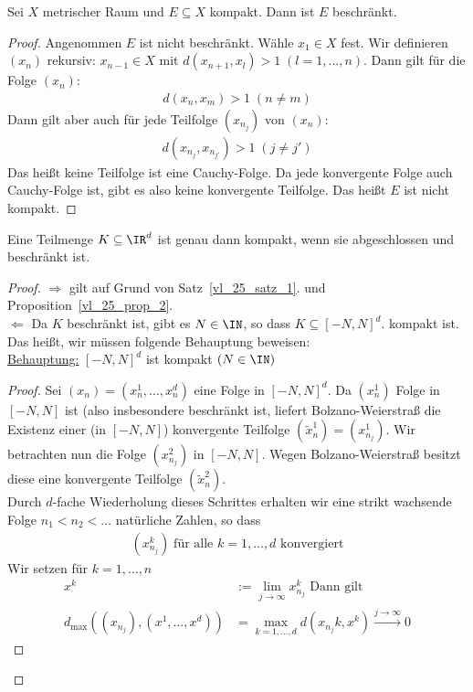 \begin{Proposition}\label{vl_25_prop_2}%
	Sei $X$ metrischer Raum und $E \subseteq X$ kompakt. Dann ist $E$ beschränkt.
\end{Proposition}

\begin{proof}
	Angenommen $E$ ist nicht beschränkt. Wähle $x_1 \in X$ fest. Wir definieren 
	$(x_n)$ rekursiv: $x_{n-1} \in X$ mit $d(x_{n+1},x_l) > 1 \; (l = 1, \hdots, 
	n)$. Dann gilt für die Folge $(x_n)$:
	\begin{align*}
		d(x_n,x_m) > 1 \;(n\neq m)
	\end{align*}
	Dann gilt aber auch für jede Teilfolge $(x_{n_j})$ von $(x_n)$:
	\begin{align*}
		d(x_{n_j},x_{n_{j\prime}}) > 1 \; (j \neq j\prime)
	\end{align*}
	Das heißt keine Teilfolge ist eine Cauchy-Folge.
	Da jede konvergente Folge auch Cauchy-Folge ist, gibt es also keine konvergente 
	Teilfolge. Das heißt $E$ ist nicht kompakt.
\end{proof}

\begin{theorem}\label{satz_v_heine_borel}
	Eine Teilmenge $K \subseteq \IR^d$ ist genau dann kompakt, wenn sie 
	abgeschlossen und beschränkt ist.
\end{theorem}

\begin{proof}
$\Rightarrow$ gilt auf Grund von Satz~\ref{vl_25_satz_1}. und 
Proposition~\ref{vl_25_prop_2}.\\
$\Leftarrow$ Da $K$ beschränkt ist, gibt es $N \in \IN$, so dass $K \subseteq 
[-N,N]^d$. kompakt ist.\\
Das heißt, wir müssen folgende Behauptung beweisen:\\
\underline{Behauptung:} $[-N, N]^d$ ist kompakt $(N \in \IN)$ 
\begin{proof}
	Sei $(x_n) = (x_n^1, \hdots, x_n^d)$ eine Folge in $[-N,N]^d$. Da 
	$(x_n^1)$ Folge in $[-N,N]$ ist (also insbesondere beschränkt ist, 
	liefert Bolzano-Weierstraß die Existenz einer (in $[-N,N]$) konvergente 
	Teilfolge $(\tilde{x}_n^1)= (x_{n_j}^1)$. Wir betrachten nun die Folge 
	$(x_{n_j}^2)$ in $[-N,N]$. Wegen Bolzano-Weierstraß besitzt diese 
	eine konvergente Teilfolge $(\tilde{x}_n^2)$.\\
	Durch $d$-fache Wiederholung dieses Schrittes erhalten wir eine strikt wachsende 
	Folge $n_1 < n_2 < \hdots$ natürliche Zahlen, so dass 
	\begin{align*}
		(x_{n_j}^k) \; \text{für alle } k = 1, \hdots, d \text{ konvergiert}
	\end{align*}
	Wir setzen für $k = 1, \hdots, n$
	\begin{align*}
		x^k & := \lim\limits_{j \rightarrow \infty}x_{n_j}^k \text{ Dann gilt} \\
		d_{\max}((x_{n_j}), (x^1, \hdots, x^d)) & = 
			\max_{k = 1, \hdots, d} d(x_{n_j}	k, x^k) 
			\xrightarrow{j \rightarrow \infty} 0
	\end{align*}
\end{proof}
\end{proof}

